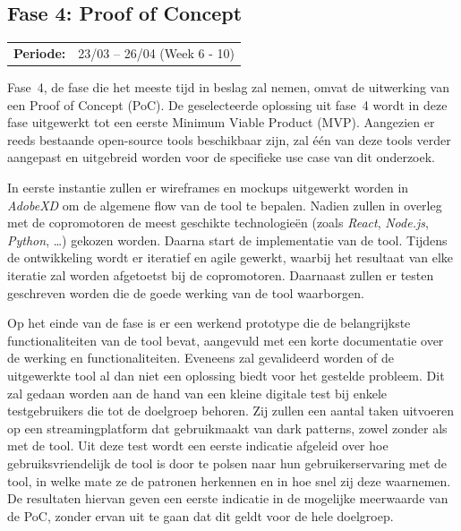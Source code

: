 \vspace{1em}

\subsection{Fase 4: Proof of Concept}
\label{subsec:proof-of-concept}

\begin{tabular}{ll}
    \hspace{0.3em} \textbf{Periode:} & 23/03 – 26/04 (Week 6 - 10)
\end{tabular}

\vspace{1em}

Fase~4, de fase die het meeste tijd in beslag zal nemen, omvat de uitwerking van een Proof of Concept (PoC). De geselecteerde oplossing uit fase~4 wordt in deze fase uitgewerkt tot een eerste Minimum Viable Product (MVP). Aangezien er reeds bestaande open-source tools beschikbaar zijn, zal één van deze tools verder aangepast en uitgebreid worden voor de specifieke use case van dit onderzoek. 

\vspace{1em}

In eerste instantie zullen er wireframes en mockups uitgewerkt worden in \emph{AdobeXD} om de algemene flow van de tool te bepalen. Nadien zullen in overleg met de copromotoren de meest geschikte technologieën (zoals \emph{React}, \emph{Node.js}, \emph{Python}, \ldots) gekozen worden. Daarna start de implementatie van de tool. Tijdens de ontwikkeling wordt er iteratief en agile gewerkt, waarbij het resultaat van elke iteratie zal worden afgetoetst bij de copromotoren. Daarnaast zullen er testen geschreven worden die de goede werking van de tool waarborgen.

\vspace{1em}

Op het einde van de fase is er een werkend prototype die de belangrijkste functionaliteiten van de tool bevat, aangevuld met een korte documentatie over de werking en functionaliteiten. Eveneens zal gevalideerd worden of de uitgewerkte tool al dan niet een oplossing biedt voor het gestelde probleem. Dit zal gedaan worden aan de hand van een kleine digitale test bij enkele testgebruikers die tot de doelgroep behoren. Zij zullen een aantal taken uitvoeren op een streamingplatform dat gebruikmaakt van dark patterns, zowel zonder als met de tool. Uit deze test wordt een eerste indicatie afgeleid over hoe gebruiksvriendelijk de tool is door te polsen naar hun gebruikerservaring met de tool, in welke mate ze de patronen herkennen en in hoe snel zij deze waarnemen. De resultaten hiervan geven een eerste indicatie in de mogelijke meerwaarde van de PoC, zonder ervan uit te gaan dat dit geldt voor de hele doelgroep.

